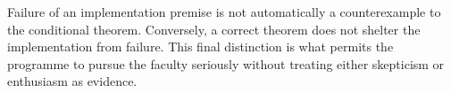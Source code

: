 Failure of an implementation premise is not automatically a counterexample to the conditional theorem. Conversely, a correct theorem does not shelter the implementation from failure. This final distinction is what permits the programme to pursue the faculty seriously without treating either skepticism or enthusiasm as evidence.
